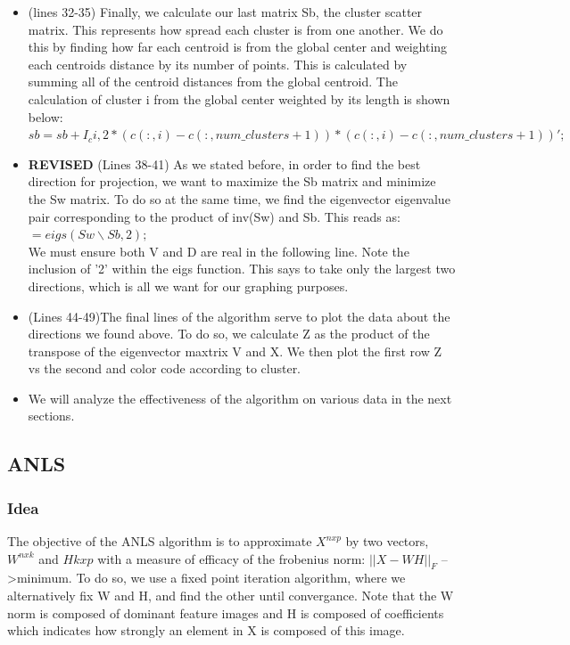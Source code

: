 \documentclass{article}
\begin{document}
\begin{itemize}
            \item(lines 32-35) Finally, we calculate our last matrix Sb, the cluster scatter matrix.  This represents how spread each cluster is from one another.  We do this by finding how far each centroid is from the global center and weighting each centroids distance by its number of points.  This is calculated by summing all of the centroid distances from the global centroid.  The calculation of cluster i from the global center weighted by its length is shown below:
        \\$sb=sb+I_c{i,2}*(c(:,i)-c(:,num\_clusters+1))*(c(:,i)-c(:,num\_clusters+1))';$\\

            \item\textbf{REVISED} (Lines 38-41)  As we stated before, in order to find the best direction for projection, we want to maximize the Sb matrix and minimize the Sw matrix.  To do so at the same time, we find the eigenvector eigenvalue pair corresponding to the product of inv(Sw) and Sb.  This reads as:
            \\\begin{math}[V,D]=eigs(Sw\backslash Sb,2); \end{math}\\
            We must ensure both V and D are real in the following line.  Note the inclusion of '2' within the eigs function.  This says to take only the largest two directions, which is all we want for our graphing purposes.  
            
            \item(Lines 44-49)The final lines of the algorithm serve to plot the data about the directions we found above.  To do so, we calculate Z as the product of the transpose of the eigenvector maxtrix V and X.  We then plot the first row Z vs the second and color code according to cluster.  
            
            \item We will analyze the effectiveness of the algorithm on various data in the next sections.
        \end{itemize}
        
\subsection*{ANLS}
    \subsubsection*{Idea}
    The objective of the ANLS algorithm is to approximate $X^{nxp}$ by two vectors, $W^{nxk}$ and $H{kxp}$ with a measure of efficacy of the frobenius norm: $||X-WH||_F$ -->minimum.  To do so, we use a fixed point iteration algorithm, where we alternatively fix W and H, and find the other until convergance.  Note that the W norm is composed of dominant feature images and H is composed of coefficients which indicates how strongly an element in X is composed of this image.  
\end{document}

